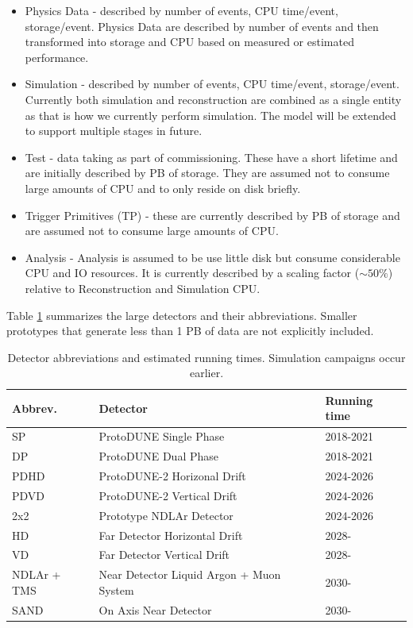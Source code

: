 \documentclass[12pt]{article}
\begin{document}
\begin{itemize}
\item Physics Data - described by number of events, CPU time/event, storage/event.  Physics Data are described by number of events and then transformed into storage and CPU based on measured or estimated performance. 
\item Simulation - described by number of events,  CPU time/event, storage/event.  Currently both simulation and reconstruction are combined as a single entity as that is how we currently perform simulation.  The model will be extended to support multiple stages in future. 
\item Test - data taking as part of commissioning.  These have a short lifetime and are initially described by PB of storage. They are assumed not to consume large amounts of CPU and to only reside on disk briefly. 
\item Trigger Primitives (TP) -  these are currently described by PB of storage and are assumed not to consume large amounts of CPU.  
\item Analysis - Analysis is assumed to be use little disk but consume considerable CPU and IO resources.  It is currently described by a scaling factor ($\sim 50\%$) relative to Reconstruction and Simulation CPU.
\end{itemize}

 Table \ref{tab:detectors} summarizes the large detectors and their abbreviations. Smaller prototypes that generate less than 1 PB of data  are not explicitly included. 

\begin{table}[h]
\begin{centering}
  \begin{tabular}{|l|l|l|}
     \hline
    Abbrev. & Detector & Running time\\
    \hline
    SP & ProtoDUNE Single Phase & 2018-2021\\
    DP & ProtoDUNE Dual Phase & 2018-2021\\
    PDHD & ProtoDUNE-2 Horizonal Drift & 2024-2026\\
    PDVD & ProtoDUNE-2 Vertical Drift & 2024-2026\\
    2x2& Prototype NDLAr Detector & 2024-2026\\
    HD & Far Detector Horizontal Drift & 2028-\\
    VD & Far Detector Vertical Drift & 2028-\\
    NDLAr + TMS & Near Detector Liquid Argon + Muon System & 2030-\\
    SAND & On Axis Near Detector & 2030- \\
     \hline
     \end{tabular}
       \caption{Detector abbreviations and estimated running times.  Simulation campaigns occur earlier. }\label{tab:detectors}
  \end{centering}
   
     \end{table}
     
\end{document}
